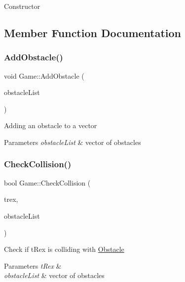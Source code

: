 Constructor 

\subsection{Member Function Documentation}
\mbox{\label{class_game_aa36f190cadcc46da84557adf1229e064}} 
\subsubsection{\texorpdfstring{Add\+Obstacle()}{AddObstacle()}}
{\footnotesize\ttfamily void Game\+::\+Add\+Obstacle (\begin{DoxyParamCaption}\item[{std\+::vector$<$ \mbox{\hyperlink{class_obstacle}{Obstacle}} $\ast$$>$ $\ast$}]{obstacle\+List }\end{DoxyParamCaption})}

Adding an obstacle to a vector 
\begin{DoxyParams}{Parameters}
{\em obstacle\+List} & vector of obstacles \\
\hline
\end{DoxyParams}
\mbox{\label{class_game_a8dcb29f9a319d8686aaa4d32b10272d6}} 
\subsubsection{\texorpdfstring{Check\+Collision()}{CheckCollision()}}
{\footnotesize\ttfamily bool Game\+::\+Check\+Collision (\begin{DoxyParamCaption}\item[{\mbox{\hyperlink{class_t_rex}{T\+Rex}} $\ast$}]{trex,  }\item[{std\+::vector$<$ \mbox{\hyperlink{class_obstacle}{Obstacle}} $\ast$$>$ $\ast$}]{obstacle\+List }\end{DoxyParamCaption})}

Check if t\+Rex is colliding with \mbox{\hyperlink{class_obstacle}{Obstacle}} 
\begin{DoxyParams}{Parameters}
{\em t\+Rex} & \\
\hline
{\em obstacle\+List} & vector of obstacles \\
\hline
\end{DoxyParams}
\mbox{\label{class_game_af993aa3307a6736836b5b970e11e58af}} 
